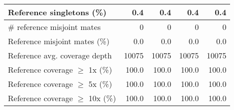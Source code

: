 \documentclass[12pt,a4paper]{article}
\begin{document}
\begin{table}[ht]
\begin{center}
\begin{tabular}{|l*{4}{|r}|}
Reference singletons (\%) & 0.4 & 0.4 & 0.4 & 0.4 \\ \hline
\# reference misjoint mates & 0 & 0 & 0 & 0 \\ \hline
Reference misjoint mates (\%) & 0.0 & 0.0 & 0.0 & 0.0 \\ \hline
Reference avg. coverage depth & 10075 & 10075 & 10075 & 10075 \\ \hline
Reference coverage $\geq$ 1x (\%) & 100.0 & 100.0 & 100.0 & 100.0 \\ \hline
Reference coverage $\geq$ 5x (\%) & 100.0 & 100.0 & 100.0 & 100.0 \\ \hline
Reference coverage $\geq$ 10x (\%) & 100.0 & 100.0 & 100.0 & 100.0 \\ \hline
\end{tabular}
\end{center}
\end{table}
\end{document}
